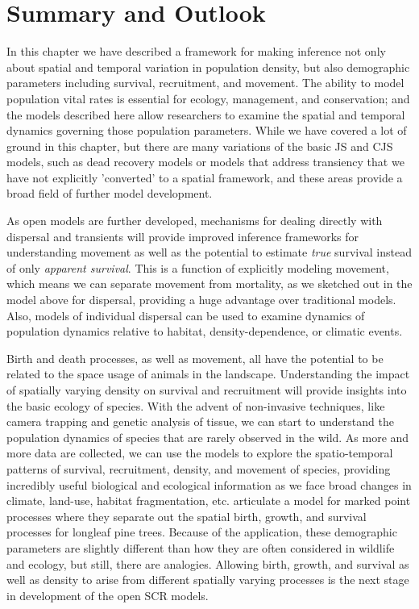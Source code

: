 \section{Summary and Outlook}

In this chapter we have described a framework for making inference not
only about spatial and temporal variation in population density, but
also demographic parameters including survival, recruitment, and
movement. The ability to model population vital rates is essential for
ecology, management, and conservation; and the models described here
allow researchers to examine the spatial and temporal dynamics
governing those population parameters.  While we have covered a lot of ground
in this chapter, but there are many variations of the basic JS and CJS models, such as dead recovery models
or models that address transiency that we have not explicitly 'converted' to a spatial framework, 
and these areas provide a broad field of further model development.

As open models are further developed, mechanisms for dealing directly
with dispersal and transients will provide improved inference
frameworks for understanding movement as well as the potential to
estimate {\it true} survival instead of only {\it apparent survival}.
This is a function of explicitly modeling movement, which means we can
separate movement from mortality, as we sketched out in the model
above for dispersal, providing a huge advantage over traditional
models.  Also, models of individual dispersal can be used to examine
dynamics of population dynamics relative to habitat,
density-dependence, or climatic events.

Birth and death processes, as well as movement, all have the potential
to be related to the space usage of animals in the landscape.
Understanding the impact of spatially varying density on survival and
recruitment will provide insights into the basic ecology of species.
With the advent of non-invasive techniques, like camera trapping and
genetic analysis of tissue, we can start to understand the population
dynamics of species that are rarely observed in the wild.  As more and
more data are collected, we can use the models to explore the
spatio-temporal patterns of survival, recruitment, density, and
movement of species, providing incredibly useful biological and
ecological information as we face broad changes in climate, land-use,
habitat fragmentation, etc.  \citet{rathbun_cressie:1994} articulate a
model for marked point processes where they separate out the spatial
birth, growth, and survival processes for longleaf pine trees.
Because of the application, these demographic parameters are slightly
different than how they are often considered in wildlife and ecology,
but still, there are analogies.  Allowing birth, growth, and survival as well
as density to arise from different spatially varying processes is the
next stage in development of the open SCR models.


